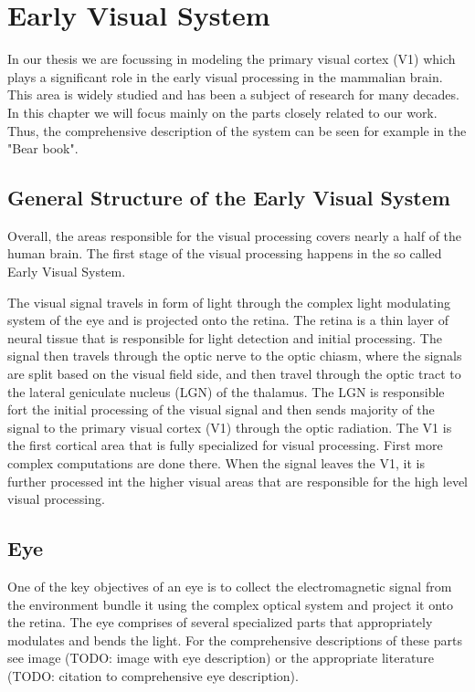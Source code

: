 \chapter{Early Visual System}
\label{chap:visual_system}
In our thesis we are focussing in modeling the primary visual cortex (V1)
which plays a significant role in the early visual processing in the
mammalian brain. This area is widely studied and has been a subject of
research for many decades. In this chapter we will focus mainly on the 
parts closely related to our work. Thus, the comprehensive description
of the system can be seen for example in the "Bear book". 

\section{General Structure of the Early Visual System}
\label{sec:general_structure}
Overall, the areas responsible for the visual processing covers nearly 
a half of the human brain. The first stage of the visual processing happens in
the so called Early Visual System.

The visual signal travels in form of light through the complex light modulating
system of the eye and is projected onto the retina. The retina is a thin layer
of neural tissue that is responsible for light detection and initial processing.
The signal then travels through the optic nerve to the optic chiasm, where the 
signals are split based on the visual field side, and then travel through the
optic tract to the lateral geniculate nucleus (LGN) of the thalamus. The LGN is
responsible fort the initial processing of the visual signal and then sends majority
of the signal to the primary visual cortex (V1) through the optic radiation. The
V1 is the first cortical area that is fully specialized for visual processing. 
First more complex computations are done there. When the signal leaves the V1,
it is further processed int the higher visual areas that are responsible for the
high level visual processing.

\section{Eye}
\label{sec:eye}
One of the key objectives of an eye is to collect the electromagnetic signal
from the environment bundle it using the complex optical system and project it
onto the retina. The eye comprises of several specialized parts that appropriately
modulates and bends the light. For the comprehensive descriptions of these 
parts see image (TODO: image with eye description) or the appropriate literature
(TODO: citation to comprehensive eye description).

